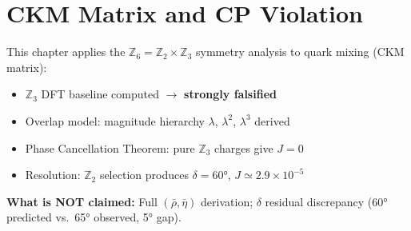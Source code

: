 
\section{CKM Matrix and CP Violation}
\label{sec:ch7_ckm}


\begin{tcolorbox}[edcGuardrail, title=\textbf{Epistemic Status}]
This chapter applies the $\mathbb{Z}_6 = \mathbb{Z}_2 \times \mathbb{Z}_3$ symmetry analysis
to quark mixing (CKM matrix):
\begin{itemize}[nosep]
    \item $\mathbb{Z}_3$ DFT baseline computed \tagDc{} $\to$ \textbf{strongly falsified}
    \item Overlap model: magnitude hierarchy $\lambda$, $\lambda^2$, $\lambda^3$ derived \tagDc{}
    \item Phase Cancellation Theorem: pure $\mathbb{Z}_3$ charges give $J = 0$ \tagDc{}
    \item Resolution: $\mathbb{Z}_2$ selection produces $\delta = 60°$, $J \simeq 2.9 \times 10^{-5}$ \tagDc{}
\end{itemize}
\textbf{What is NOT claimed:} Full $(\bar\rho, \bar\eta)$ derivation;
$\delta$ residual discrepancy (60° predicted vs.\ 65° observed, 5° gap).
\end{tcolorbox}


